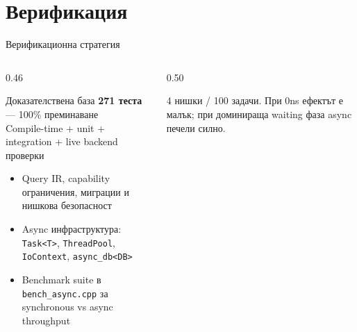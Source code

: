 \documentclass[aspectratio=169,12pt]{beamer}
\begin{document}
\section{Верификация}

\begin{frame}{Верификационна стратегия}
    \begin{columns}[T]
        \begin{column}{0.46\textwidth}
            \begin{block}{Доказателствена база}
                \textbf{271 теста} — 100\% преминаване\\
                {\small Compile-time + unit + integration + live backend проверки}
            \end{block}
            \begin{itemize}\scriptsize
                \item Query IR, capability ограничения, миграции и нишкова безопасност
                \item Async инфраструктура: \texttt{Task<T>}, \texttt{ThreadPool}, \texttt{IoContext}, \texttt{async\_db<DB>}
                \item Benchmark suite в \texttt{bench\_async.cpp} за synchronous vs async throughput
            \end{itemize}
        \end{column}
        \begin{column}{0.50\textwidth}
            \centering
            \vspace{0.05em}
            {\tiny 4 нишки / 100 задачи. При 0ns ефектът е малък; при доминираща waiting фаза async печели силно.}
        \end{column}
    \end{columns}
\end{frame}
\end{document}
